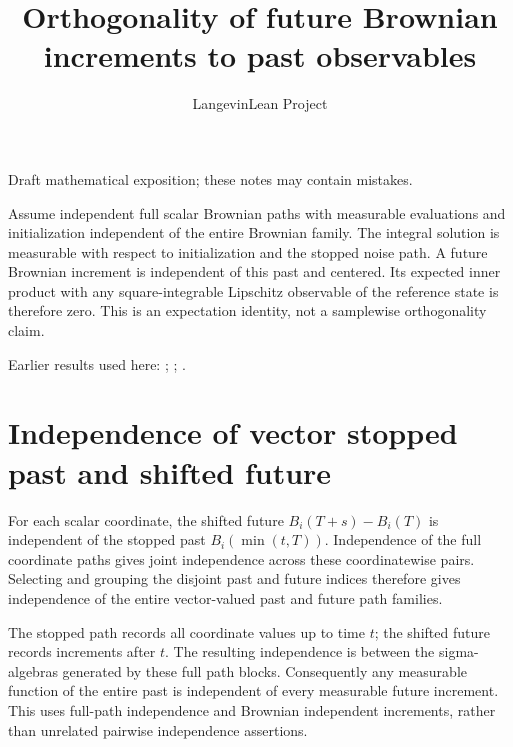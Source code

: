 \documentclass[11pt,a4paper]{article}
\title{\texorpdfstring{Orthogonality of future Brownian increments to past observables}{Orthogonality of future Brownian increments to past observables}}
\author{LangevinLean Project}
\date{}
\begin{document}
\maketitle
Draft mathematical exposition; these notes may contain mistakes.


Assume independent full scalar Brownian paths with measurable evaluations and initialization independent of the entire Brownian family. The integral solution is measurable with respect to initialization and the stopped noise path. A future Brownian increment is independent of this past and centered. Its expected inner product with any square-integrable Lipschitz observable of the reference state is therefore zero. This is an expectation identity, not a samplewise orthogonality claim.



Earlier results used here: \cite[Section~3.54]{LangevinLean2026ULASC}; \cite[Section~3.25]{LangevinLean2026ULASC}; \cite[Section~3.31]{LangevinLean2026ULASC}.

\section{\texorpdfstring{Independence of vector stopped past and shifted future}{Independence of vector stopped past and shifted future}}


For each scalar coordinate, the shifted future \(B_i(T+s)-B_i(T)\) is independent of the stopped past \(B_i(\min(t,T))\). Independence of the full coordinate paths gives joint independence across these coordinatewise pairs. Selecting and grouping the disjoint past and future indices therefore gives independence of the entire vector-valued past and future path families.



The stopped path records all coordinate values up to time \(t\); the shifted future records increments after \(t\). The resulting independence is between the sigma-algebras generated by these full path blocks. Consequently any measurable function of the entire past is independent of every measurable future increment. This uses full-path independence and Brownian independent increments, rather than unrelated pairwise independence assertions.
\end{document}
